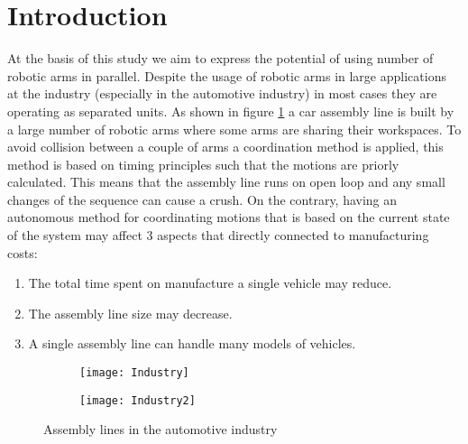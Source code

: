 \section{Introduction}
\label{section:introduction}
At the basis of this study we aim to express the potential of using number of robotic arms in parallel. Despite the usage of robotic arms in large applications at the industry (especially in the automotive industry) in most cases they are operating as separated units. As shown in figure \ref{fig:automotive_industry_example} a car assembly line is built by a large number of robotic arms where some arms are sharing their workspaces. To avoid collision between a couple of arms a coordination method is applied, this method is based on timing principles such that the motions are priorly calculated. This means that the assembly line runs on open loop and any small changes of the sequence can cause a crush. On the contrary, having an autonomous method for coordinating motions that is based on the current state of the system may affect 3 aspects that directly connected to manufacturing costs:

\begin{enumerate}
\item The total time spent on manufacture a single vehicle may reduce.
\item The assembly line size may decrease.
\item A single assembly line can handle many models of vehicles.
\end{enumerate}



\begin{figure}[htb]
\centering
\begin{subfigure}{.5\textwidth}
  \centering
  \texttt{[image: Industry]}
\end{subfigure}%
\begin{subfigure}{.5\textwidth}
  \centering
  \texttt{[image: Industry2]}
\end{subfigure}
\caption{Assembly lines in the automotive industry}
\label{fig:automotive_industry_example}
\end{figure}
